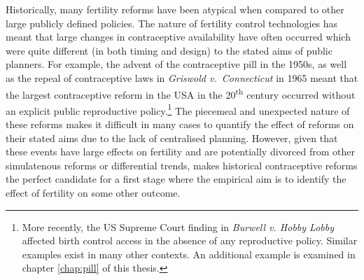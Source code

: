 Historically, many fertility reforms have been atypical when compared to other 
large publicly defined policies.  The nature of fertility control technologies 
has meant that large changes in contraceptive availability have often occurred
which were quite different (in both timing and design) to the stated aims of
public planners.  For example, the advent of the contraceptive pill in the 
1950s, as well as the repeal of contraceptive laws in \emph{Griswold v.\ 
Connecticut} in 1965 \citep{Bailey2013} meant that the largest contraceptive 
reform in the USA in the 20\textsuperscript{th} century occurred without an 
explicit public reproductive policy.\footnote{More recently, the US Supreme 
Court finding in \emph{Burwell v. Hobby Lobby} affected birth control access 
in the absence of any reproductive policy.  Similar examples exist in many other 
contexts.  An additional example is examined in chapter \ref{chap:pill} of this
thesis.} The piecemeal and unexpected nature of these reforms makes it difficult 
in many cases to quantify the effect of reforms on their stated aims due to the
lack of centralised planning. However, given that these events have large 
effects on fertility and are potentially divorced from other simulatenous 
reforms or differential trends, makes historical contraceptive reforms the 
perfect candidate for a first stage where the empirical aim is to identify the 
effect of fertility on some other outcome.


